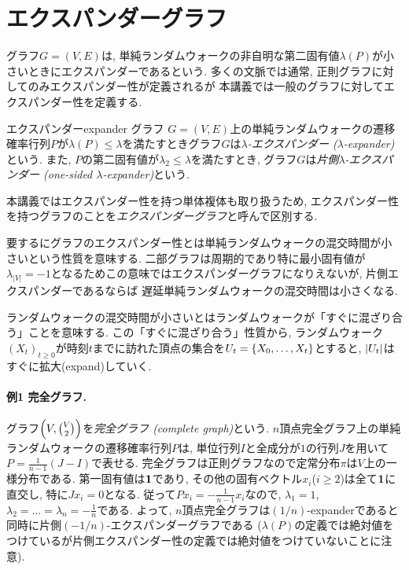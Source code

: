 \section{エクスパンダーグラフ}
グラフ$G=(V,E)$は, 単純ランダムウォークの非自明な第二固有値$\lambda(P)$が小さいときにエクスパンダーであるという.
多くの文脈では通常, 正則グラフに対してのみエクスパンダー性が定義されるが
本講義では一般のグラフに対してエクスパンダー性を定義する.
\begin{definition}{エクスパンダー}{expander}
    グラフ $G=(V,E)$上の単純ランダムウォークの遷移確率行列$P$が$\lambda(P) \le \lambda$を満たすときグラフ$G$は\emph{$\lambda$-エクスパンダー ($\lambda$-expander)}という.
    また, $P$の第二固有値が$\lambda_2 \le \lambda$を満たすとき, グラフ$G$は\emph{片側$\lambda$-エクスパンダー (one-sided $\lambda$-expander)}という.
\end{definition}
本講義ではエクスパンダー性を持つ単体複体も取り扱うため,
エクスパンダー性を持つグラフのことを\emph{エクスパンダーグラフ}と呼んで区別する.

要するにグラフのエクスパンダー性とは単純ランダムウォークの混交時間が小さいという性質を意味する.
二部グラフは周期的であり特に最小固有値が$\lambda_{|V|}=-1$となるためこの意味ではエクスパンダーグラフになりえないが,
片側エクスパンダーであるならば
遅延単純ランダムウォークの混交時間は小さくなる.

ランダムウォークの混交時間が小さいとはランダムウォークが「すぐに混ざり合う」ことを意味する.
この「すぐに混ざり合う」性質から, ランダムウォーク$(X_t)_{t\ge 0}$が時刻$t$までに訪れた頂点の集合を$U_t = \cbra*{X_0,\dots,X_t}$とすると, $\abs{U_t}$はすぐに拡大(expand)していく.

\paragraph*{例1 完全グラフ.}
グラフ$\rbra*{V, \binom{V}{2}}$を\emph{完全グラフ (complete graph)}という.
$n$頂点完全グラフ上の単純ランダムウォークの遷移確率行列$P$は, 単位行列$I$と全成分が$1$の行列$J$を用いて
$P = \frac{1}{n-1}(J-I)$で表せる.
完全グラフは正則グラフなので定常分布$\pi$は$V$上の一様分布である.
第一固有値は$\allone$であり,
その他の固有ベクトル$x_i$($i\ge 2$)は全て$\allone$に直交し, 特に$Jx_i = 0$となる.
従って$P x_i = -\frac{1}{n-1}x_i$なので, $\lambda_1=1$, $\lambda_2=\dots=\lambda_n = -\frac{1}{n}$である.
よって, $n$頂点完全グラフは$(1/n)$-expanderであると同時に片側$(-1/n)$-エクスパンダーグラフである
($\lambda(P)$の定義では絶対値をつけているが片側エクスパンダー性の定義では絶対値をつけていないことに注意).
%

